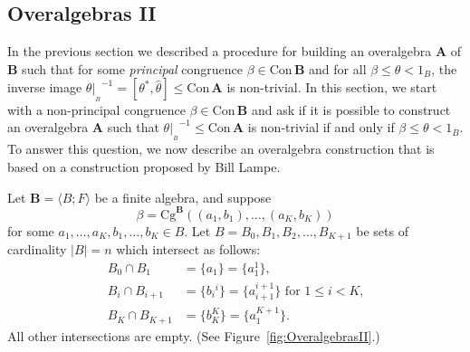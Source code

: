 \documentclass[cm,dissertation,actual,final]{uhthesis}
\theoremstyle{plain}
\theoremstyle{definition}
\theoremstyle{remark}
\numberwithin{theorem}{section}
\numberwithin{claim}{chapter}
\numberwithin{equation}{section}
\numberwithin{conjecture}{chapter}
\newcommand{\<}{\ensuremath{\langle}}
\renewcommand{\>}{\ensuremath{\rangle}}
\renewcommand{\leq}{\ensuremath{\leqslant}}
\newcommand{\Cg}{\ensuremath{\mathrm{Cg}}}
\newcommand{\Con}{\ensuremath{\mathrm{Con\,}}}
\newcommand{\supi}{\ensuremath{^{i}}}
\newcommand{\0}{\ensuremath{\mathbf{0}}}
\newcommand{\1}{\ensuremath{\mathbf{1}}}
\newcommand{\2}{\ensuremath{\mathbf{2}}}
\newcommand{\3}{\ensuremath{\mathbf{3}}}
\newcommand{\4}{\ensuremath{\mathbf{4}}}
\newcommand{\5}{\ensuremath{\mathbf{5}}}
\newcommand{\bA}{\ensuremath{\mathbf{A}}}
\newcommand{\bB}{\ensuremath{\mathbf{B}}}
\newcommand{\resB}{\ensuremath{|_{_B}}}
\begin{document}
\subsection{Overalgebras II}
\label{sec:overalgebras-ii}
In the previous section we described a procedure for building an
overalgebra $\bA$ of $\bB$ such that for some 
\emph{principal} congruence $\beta\in \Con\bB$ and for all 
$\beta \leq \theta < 1_B$, the inverse image $\theta \resB^{-1} = [\theta^*,
  \widehat{\theta}] \leq \Con\bA$ is non-trivial.
In this section, we start with a non-principal congruence $\beta\in \Con\bB$ and
ask if it is possible to construct an overalgebra $\bA$ such that 
$\theta\resB^{-1}\leq \Con\bA$ is non-trivial if and only if 
$\beta \leq \theta < 1_B$.  
To answer this question, we now describe an overalgebra construction that is
based on a construction proposed by Bill Lampe.

Let $\bB = \<B; F\>$ be a finite algebra, and suppose 
\[
\beta = \Cg^{\bB}((a_1, b_1), \dots, (a_K,b_K))
\]
for some $a_1, \dots, a_K, b_1, \dots, b_K \in B$.
Let $B=B_0, B_1, B_2, \dots, B_{K+1}$ be sets of cardinality $|B| = n$
which intersect as follows: 
\begin{align*}
  B_0\cap B_1 &=\{a_1\}=\{a_1^{1}\},\\
  B_i \cap B_{i+1} &= \{b_i\supi\}=\{a^{i+1}_{i+1}\} \text{ for $1\leq i < K$,}\\
  B_K\cap B_{K+1}&=\{b^{K}_K\}=\{a_1^{K+1}\}.
\end{align*}
All other intersections are empty. (See Figure~\ref{fig:OveralgebrasII}.)
\end{document}
